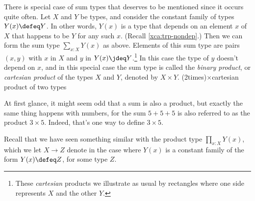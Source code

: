 There is special case of sum types that deserves to be mentioned since
it occurs quite often. Let $X$ and $Y$ be types, and consider the constant
family of types $Y(x)\defeq Y$. In other words, $Y(x)$ is a type that depends
on an element $x$ of $X$ that happens to be $Y$ for any such $x$.
(Recall \cref{xca:trp-nondep}.)
Then we can form the sum type $\sum_{x:X} Y(x)$ as above.
Elements of this sum type are pairs $(x,y)$
with $x$ in $X$ and $y$ in $Y(x)\jdeq Y$.\footnote{%
  These \emph{cartesian} products we illustrate as usual
  by rectangles where one side represents $X$ and the other $Y$.\par
  }
In this case the type of $y$
doesn't depend on $x$, and in this special case the sum type is called
the \emph{binary product}, or \emph{cartesian product} of the types $X$ and $Y$,
denoted by $X \times Y$.
\glossary(2times){$\times$}{cartesian product of two types}

At first glance, it might seem odd that a sum is also a product, but exactly the same thing happens with numbers, for the sum $5+5+5$ is also
referred to as the product $3 \times 5$.  Indeed, that's one way to define $3 \times 5$.

Recall that we have seen something similar with the product type $\prod_{x:X} Y(x)$, which we let $X \to Z$ denote in the case where $Y(x)$ is a
constant family of the form $Y(x)\defeq Z$, for some type $Z$.

